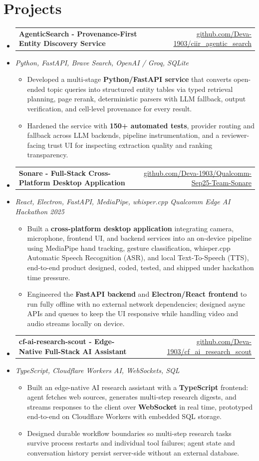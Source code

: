 \documentclass[letterpaper,10pt]{article}
\makeatletter
\newcommand{\resumeItem}[1]{
  \item\small{#1\vspace{-1pt}}
}
\newcommand{\resumeProjectHeading}[2]{
    \item
    \begin{tabular*}{0.985\textwidth}[t]{l@{\extracolsep{\fill}}r}
      \small\textbf{#1} & \small #2 \\
    \end{tabular*}\vspace{-5pt}
}
\newcommand{\resumeProjectSubheading}[1]{
  \vspace{-2pt}\item[] {\small\textcolor{ResumeSlate}{\emph{#1}}}\vspace{-3pt}
}
\newcommand{\resumeSubHeadingListStart}{\begin{itemize}[leftmargin=0.0in, label={}, itemsep=2pt, topsep=2pt]}
\newcommand{\resumeSubHeadingListEnd}{\end{itemize}}
\newcommand{\resumeItemListStart}{\begin{itemize}[leftmargin=0.18in, itemsep=2pt, topsep=1pt]}
\newcommand{\resumeItemListEnd}{\end{itemize}\vspace{-4pt}}
\makeatother
\begin{document}
\section{Projects}
\resumeSubHeadingListStart
  \resumeProjectHeading
    {AgenticSearch - Provenance-First Entity Discovery Service}
    {\href{https://github.com/Deva-1903/ciir_agentic_search}{github.com/Deva-1903/ciir\_agentic\_search}}
  \resumeProjectSubheading{Python, FastAPI, Brave Search, OpenAI / Groq, SQLite}
    \resumeItemListStart
      \resumeItem{Developed a multi-stage \textbf{Python/FastAPI service} that converts open-ended topic queries into structured entity tables via typed retrieval planning, page rerank, deterministic parsers with LLM fallback, output verification, and cell-level provenance for every result.}
      \resumeItem{Hardened the service with \textbf{150+ automated tests}, provider routing and fallback across LLM backends, pipeline instrumentation, and a reviewer-facing trust UI for inspecting extraction quality and ranking transparency.}
    \resumeItemListEnd
  \resumeProjectHeading
    {Sonare - Full-Stack Cross-Platform Desktop Application}
    {\href{https://github.com/Deva-1903/Qualcomm-Sep25-Team-Sonare}{github.com/Deva-1903/Qualcomm-Sep25-Team-Sonare}}
  \resumeProjectSubheading{React, Electron, FastAPI, MediaPipe, whisper.cpp \enspace\textbar\enspace Qualcomm Edge AI Hackathon 2025}
    \resumeItemListStart
      \resumeItem{Built a \textbf{cross-platform desktop application} integrating camera, microphone, frontend UI, and backend services into an on-device pipeline using MediaPipe hand tracking, gesture classification, whisper.cpp Automatic Speech Recognition (ASR), and local Text-To-Speech (TTS), end-to-end product designed, coded, tested, and shipped under hackathon time pressure.}
      \resumeItem{Engineered the \textbf{FastAPI backend} and \textbf{Electron/React frontend} to run fully offline with no external network dependencies; designed async APIs and queues to keep the UI responsive while handling video and audio streams locally on device.}
    \resumeItemListEnd
  \resumeProjectHeading
    {cf-ai-research-scout - Edge-Native Full-Stack AI Assistant}
    {\href{https://github.com/Deva-1903/cf_ai_research_scout}{github.com/Deva-1903/cf\_ai\_research\_scout}}
  \resumeProjectSubheading{TypeScript, Cloudflare Workers AI, WebSockets, SQL}
    \resumeItemListStart
      \resumeItem{Built an edge-native AI research assistant with a \textbf{TypeScript} frontend: agent fetches web sources, generates multi-step research digests, and streams responses to the client over \textbf{WebSocket} in real time, prototyped end-to-end on Cloudflare Workers with embedded SQL storage.}
      \resumeItem{Designed durable workflow boundaries so multi-step research tasks survive process restarts and individual tool failures; agent state and conversation history persist server-side without an external database.}
    \resumeItemListEnd
\resumeSubHeadingListEnd
\vspace{-4pt}
\end{document}
